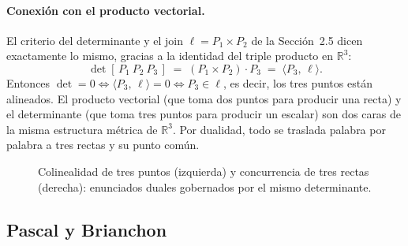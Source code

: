\documentclass[11pt,a4paper]{article}
\newcommand{\R}{\mathbb{R}}
\newcommand{\inc}[2]{\langle #1,\, #2\rangle}
\begin{document}
\paragraph{Conexión con el producto vectorial.}
El criterio del determinante y el join $\ell=P_1\times P_2$ de la
Sección~2.5 dicen exactamente lo mismo, gracias a la identidad del triple
producto en $\R^3$:
\[
  \det[\,P_1\ P_2\ P_3\,]
  \;=\; (P_1\times P_2)\cdot P_3
  \;=\; \inc{P_3}{\ell}.
\]
Entonces $\det=0 \iff \inc{P_3}{\ell}=0 \iff P_3\in\ell$, es decir, los
tres puntos están alineados. El producto vectorial (que toma dos puntos
para producir una recta) y el determinante (que toma tres puntos para
producir un escalar) son dos caras de la misma estructura métrica de
$\R^3$. Por dualidad, todo se traslada palabra por palabra a tres rectas
y su punto común.

\begin{figure}[ht]
\centering
{}
\caption{Colinealidad de tres puntos (izquierda) y concurrencia de tres
rectas (derecha): enunciados duales gobernados por el mismo determinante.}
\label{fig:dual}
\end{figure}

\subsection{Pascal y Brianchon}
\end{document}
